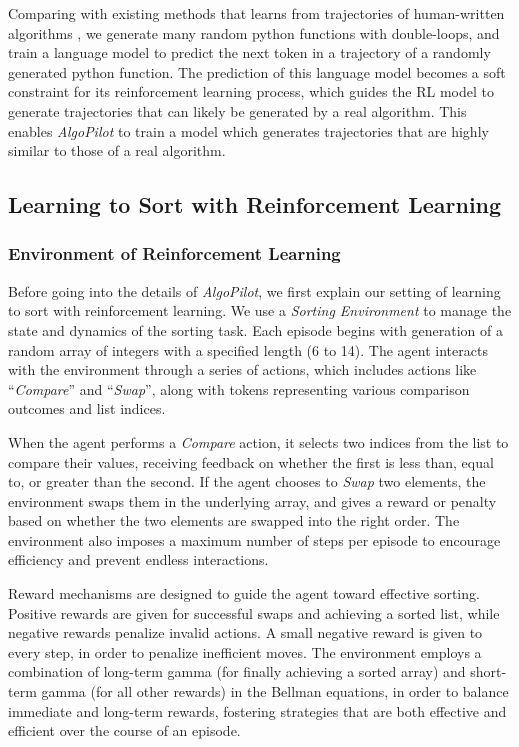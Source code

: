 \documentclass[pdflatex,sn-mathphys-num]{sn-jnl}%
\theoremstyle{thmstyleone}%
\theoremstyle{thmstyletwo}%
\theoremstyle{thmstylethree}%
\begin{document}
Comparing with existing methods that learns from trajectories of human-written algorithms \cite{reed2015neural} \cite{velivckovic2021neural} \cite{zhang2022causal}, we generate many random python functions with double-loops, and train a language model to predict the next token in a trajectory of a randomly generated python function. The prediction of this language model becomes a soft constraint for its reinforcement learning process, which guides the RL model to generate trajectories that can likely be generated by a real algorithm. This enables \emph{AlgoPilot} to train a model which generates trajectories that are highly similar to those of a real algorithm.


\subsection{Learning to Sort with Reinforcement Learning} \label{ssec:rl}

\subsubsection{Environment of Reinforcement Learning} 

Before going into the details of \emph{AlgoPilot}, we first explain our setting of learning to sort with reinforcement learning. We use a \emph{Sorting Environment} to manage the state and dynamics of the sorting task. Each episode begins with generation of a random array of integers with a specified length (6 to 14).  The agent interacts with the environment through a series of actions, which includes actions like ``\emph{Compare}'' and ``\emph{Swap}'', along with tokens representing various comparison outcomes and list indices.

When the agent performs a \emph{Compare} action, it selects two indices from the list to compare their values, receiving feedback on whether the first is less than, equal to, or greater than the second. If the agent chooses to \emph{Swap} two elements, the environment swaps them in the underlying array, and gives a reward or penalty based on whether the two elements are swapped into the right order. The environment also imposes a maximum number of steps per episode to encourage efficiency and prevent endless interactions.

Reward mechanisms are designed to guide the agent toward effective sorting. Positive rewards are given for successful swaps and achieving a sorted list, while negative rewards penalize invalid actions. A small negative reward is given to every step, in order to penalize inefficient moves. The environment employs a combination of long-term gamma (for finally achieving a sorted array) and short-term gamma (for all other rewards) in the Bellman equations, in order to balance immediate and long-term rewards, fostering strategies that are both effective and efficient over the course of an episode.
\end{document}
